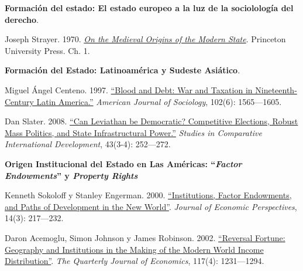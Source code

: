 \documentclass[letterpaper]{article}
\renewenvironment{itemize}{
  \begin{list}{}{
    \setlength{\leftmargin}{1.5em}
  }
}{
  \end{list}
}
\begin{document}
\begin{enumerate}[label=\roman*.]
\begin{itemize}
			\item[3.] {\bf Formaci\'on del estado: El estado europeo a la luz de la sociololog\'ia del derecho}.
				\begin{itemize} 
					\item[$\circ$] Joseph Strayer. 1970. \href{https://github.com/hbahamonde/Ciencia_Politica_II/raw/master/Readings/Strayer.pdf}{\emph{On the Medieval Origins of the Modern State}}. Princeton University Press. Ch. 1.
				\end{itemize}

			\item[4.] {\bf Formaci\'on del Estado: Latinoam\'erica y Sudeste Asi\'atico}.
				\begin{itemize}
					\item[$\circ$] Miguel \'Angel Centeno. 1997. \href{https://github.com/hbahamonde/Ciencia_Politica_II/raw/master/Readings/Centeno.pdf}{``Blood and Debt: War and Taxation in Nineteenth-Century Latin America.''} \emph{American Journal of Sociology}, 102(6): 1565---1605. 
					
					\item[$\circ$] Dan Slater. 2008. \href{https://github.com/hbahamonde/Ciencia_Politica_II/raw/master/Readings/Slater.pdf}{``Can Leviathan be Democratic? Competitive Elections, Robust Mass Politics, and State Infrastructural Power.''} \emph{Studies in Comparative International Development}, 43(3-4): 252---272.
				\end{itemize}

		\item[5.] {\bf Origen Institucional del Estado en Las Am\'ericas: ``\emph{Factor Endowments}'' y \emph{Property Rights}}
				\begin{itemize}
					\item[$\circ$] Kenneth Sokoloff y Stanley Engerman. 2000. \href{https://github.com/hbahamonde/Ciencia_Politica_II/raw/master/Readings/Sokoloff_Engerman.pdf}{``Institutions, Factor Endowments, and Paths of Development in the New World''}. \emph{Journal of Economic Perspectives}, 14(3): 217---232. 
					\item[$\circ$] Daron Acemoglu, Simon Johnson y James Robinson. 2002. \href{https://github.com/hbahamonde/Ciencia_Politica_II/raw/master/Readings/Reversal_of_fortune.pdf}{``Reversal Fortune: Geography and Institutions in the Making of the Modern World Income Distribution''}. \emph{The Quarterly Journal of Economics}, 117(4): 1231---1294. 
				\end{itemize}



\end{itemize}
\end{enumerate}
\end{document}
